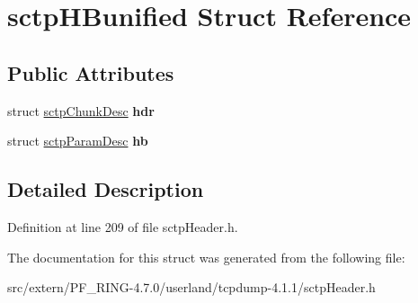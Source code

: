 \hypertarget{structsctp_h_bunified}{
\section{sctpHBunified Struct Reference}
\label{structsctp_h_bunified}
}
\subsection*{Public Attributes}
\begin{DoxyCompactItemize}
\item 
\hypertarget{structsctp_h_bunified_a4912bd4934c3b7c8d079366f1b95bf1b}{
struct \hyperlink{structsctp_chunk_desc}{sctpChunkDesc} {\bfseries hdr}}
\label{structsctp_h_bunified_a4912bd4934c3b7c8d079366f1b95bf1b}

\item 
\hypertarget{structsctp_h_bunified_a14e517b210cd5693665ddd75761d5fab}{
struct \hyperlink{structsctp_param_desc}{sctpParamDesc} {\bfseries hb}}
\label{structsctp_h_bunified_a14e517b210cd5693665ddd75761d5fab}

\end{DoxyCompactItemize}


\subsection{Detailed Description}


Definition at line 209 of file sctpHeader.h.



The documentation for this struct was generated from the following file:\begin{DoxyCompactItemize}
\item 
src/extern/PF\_\-RING-\/4.7.0/userland/tcpdump-\/4.1.1/sctpHeader.h\end{DoxyCompactItemize}
